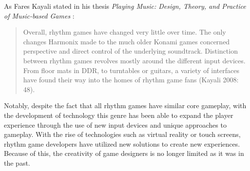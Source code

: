 As Fares Kayali stated in his thesis \textit{Playing Music: Design, Theory, and Practice of Music-based Games} \cite{faresplayingmusic}:
\begin{quote}
    Overall, rhythm games have changed very little over time. The only changes Harmonix made to the much older Konami games concerned perspective and direct control of the underlying soundtrack. Distinction between rhythm games revolves mostly around the different input devices. From floor mats in DDR, to turntables or guitars, a variety of interfaces have found their way into the homes of rhythm game fans (Kayali 2008: 48).
\end{quote}
Notably, despite the fact that all rhythm games have similar core gameplay, with the development of technology this genre has been able to expand the player experience through the use of new input devices and unique approaches to gameplay. With the rise of technologies such as virtual reality or touch screens, rhythm game developers have utilized new solutions to create new experiences. Because of this, the creativity of game designers is no longer limited as it was in the past.


